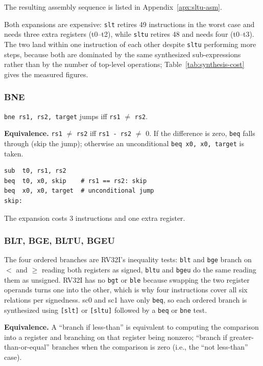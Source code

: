 The resulting assembly sequence is listed in Appendix~\ref{apx:sltu-asm}.

Both expansions are expensive: \texttt{slt} retires 49 instructions in the worst case and needs three
extra registers (t0--t2), while \texttt{sltu} retires 48 and needs four (t0--t3). The two land within
one instruction of each other despite \texttt{sltu} performing more steps, because both are dominated
by the same synthesized sub-expressions rather than by the number of top-level operations;
Table~\ref{tab:synthesis-cost} gives the measured figures.

\subsubsection{BNE} \label{sec:sc1-bne}

\texttt{bne rs1, rs2, target} jumps iff \texttt{rs1} $\neq$ \texttt{rs2}.

\textbf{Equivalence.} \texttt{rs1} $\neq$ \texttt{rs2} iff \texttt{rs1 - rs2} $\neq$ 0. If the
difference is zero, \texttt{beq} falls through (skip the jump); otherwise an unconditional
\texttt{beq x0, x0, target} is taken.

\begin{lstlisting}
sub  t0, rs1, rs2
beq  t0, x0, skip    # rs1 == rs2: skip
beq  x0, x0, target  # unconditional jump
skip:
\end{lstlisting}

The expansion costs 3 instructions and one extra register.

\subsubsection{BLT, BGE, BLTU, BGEU} \label{sec:sc1-ordered-branches}

The four ordered branches are RV32I's inequality tests: \texttt{blt} and \texttt{bge} branch on
$<$ and $\geq$ reading both registers as signed, \texttt{bltu} and \texttt{bgeu} do the same
reading them as unsigned. RV32I has no \texttt{bgt} or \texttt{ble} because swapping the two
register operands turns one into the other, which is why four instructions cover all six relations
per signedness. sc0 and sc1 have only \texttt{beq}, so each ordered branch is synthesized using
\texttt{[slt]} or \texttt{[sltu]} followed by a \texttt{beq} or \texttt{bne} test.

\textbf{Equivalence.} A ``branch if less-than'' is equivalent to computing the comparison into a
register and branching on that register being nonzero; ``branch if greater-than-or-equal'' branches
when the comparison is zero (i.e., the ``not less-than'' case).

